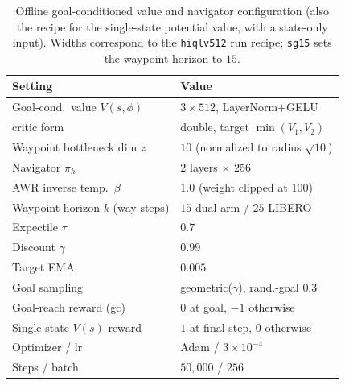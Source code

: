 \documentclass[letterpaper]{article} %
\begin{document}
\begin{table}[t]
\centering\small\setlength{\tabcolsep}{4pt}
\begin{tabular}{@{}ll@{}}
\toprule
Setting & Value \\
\midrule
Goal-cond.\ value $V(s,\phi)$        & $3\times512$, LayerNorm$+$GELU \\
\quad critic form                    & double, target $\min(V_1,V_2)$ \\
Waypoint bottleneck dim $z$           & $10$ (normalized to radius $\sqrt{10}$) \\
Navigator $\pi_h$                    & $2$ layers $\times$ $256$ \\
\quad AWR inverse temp.\ $\beta$      & $1.0$ (weight clipped at $100$) \\
Waypoint horizon $k$ (way steps)      & $15$ dual-arm / $25$ LIBERO \\
Expectile $\tau$                     & $0.7$ \\
Discount $\gamma$                    & $0.99$ \\
Target EMA                           & $0.005$ \\
Goal sampling                        & geometric($\gamma$), rand.-goal $0.3$ \\
Goal-reach reward (gc)               & $0$ at goal, $-1$ otherwise \\
Single-state $V(s)$ reward           & $1$ at final step, $0$ otherwise \\
Optimizer / lr                       & Adam / $3{\times}10^{-4}$ \\
Steps / batch                        & $50{,}000$ / $256$ \\
\bottomrule
\end{tabular}
\caption{Offline goal-conditioned value and navigator configuration (also the
recipe for the single-state potential value, with a state-only input). Widths
correspond to the \texttt{hiqlv512} run recipe; \texttt{sg15} sets the waypoint
horizon to $15$.}
\label{tab:simvalue}
\end{table}
\end{document}
